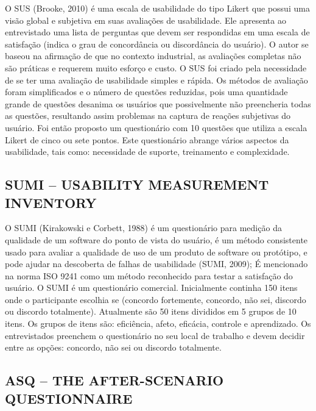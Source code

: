 O SUS (Brooke, 2010) é uma escala de usabilidade do tipo Likert que possui uma visão global e subjetiva em suas avaliações de usabilidade. Ele apresenta ao entrevistado uma lista de perguntas que devem ser respondidas em uma escala de satisfação (indica o grau de concordância ou discordância do usuário). 
O autor se baseou na afirmação de que no contexto industrial, as avaliações completas não são práticas e requerem muito esforço e custo. O SUS foi criado pela necessidade de se ter uma avaliação de usabilidade simples e rápida. Os métodos de avaliação foram simplificados e o número de questões reduzidas, pois uma quantidade grande de questões desanima os usuários que possivelmente não preencheria todas as questões, resultando assim problemas na captura de reações subjetivas do usuário. Foi então proposto um questionário com 10 questões que utiliza a escala Likert de cinco ou sete pontos. Este questionário abrange vários aspectos da usabilidade, tais como: necessidade de suporte, treinamento e complexidade.

\subsection{SUMI – USABILITY MEASUREMENT INVENTORY}

	O SUMI (Kirakowski e Corbett, 1988) é um questionário para medição da qualidade de um software do ponto de vista do usuário, é um método consistente usado para avaliar a qualidade de uso de um produto de software ou protótipo, e pode ajudar na descoberta de falhas de usabilidade (SUMI, 2009); É mencionado na norma ISO 9241 como um método reconhecido para testar a satisfação do usuário. O SUMI é um questionário comercial. 
	Inicialmente continha 150 itens onde o participante escolhia se (concordo fortemente, concordo, não sei, discordo ou discordo totalmente). Atualmente são 50 itens divididos em 5 grupos de 10 itens. Os grupos de itens são: eficiência, afeto, eficácia, controle e aprendizado. Os entrevistados preenchem o questionário no seu local de trabalho e devem decidir entre as opções: concordo, não sei ou discordo totalmente.

\subsection{ASQ – THE AFTER-SCENARIO QUESTIONNAIRE}

